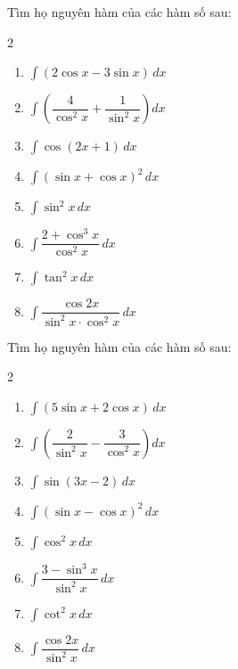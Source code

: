 \documentclass[12pt]{article}
\begin{document}
	\begin{btxanh}
		Tìm họ nguyên hàm của các hàm số sau:
		\begin{multicols}{2}
			\begin{enumerate}[label=\alph*)]
				\item $\displaystyle \int (2\cos x - 3\sin x) \,dx$
				\item $\displaystyle \int \left( \dfrac{4}{\cos^2 x} + \dfrac{1}{\sin^2 x} \right) dx$
				\item $\displaystyle \int \cos(2x + 1) \,dx$
				\item $\displaystyle \int (\sin x + \cos x)^2 \,dx$
				\item $\displaystyle \int \sin^2 x \,dx$
				\item $\displaystyle \int \dfrac{2 + \cos^3 x}{\cos^2 x} \,dx$
				\item $\displaystyle \int \tan^2 x \,dx$
				\item $\displaystyle \int \dfrac{\cos 2x}{\sin^2 x \cdot \cos^2 x} \,dx$
			\end{enumerate}
		\end{multicols}
	\end{btxanh}
	
	\begin{btvang}
		Tìm họ nguyên hàm của các hàm số sau:
		\begin{multicols}{2}
			\begin{enumerate}[label=\alph*)]
				\item $\displaystyle \int (5\sin x + 2\cos x) \,dx$
				\item $\displaystyle \int \left( \dfrac{2}{\sin^2 x} - \dfrac{3}{\cos^2 x} \right) dx$
				\item $\displaystyle \int \sin(3x - 2) \,dx$
				\item $\displaystyle \int (\sin x - \cos x)^2 \,dx$
				\item $\displaystyle \int \cos^2 x \,dx$
				\item $\displaystyle \int \dfrac{3 - \sin^3 x}{\sin^2 x} \,dx$
				\item $\displaystyle \int \cot^2 x \,dx$
				\item $\displaystyle \int \dfrac{\cos 2x}{\sin^2 x} \,dx$
			\end{enumerate}
		\end{multicols}
	\end{btvang}
	
\end{document}

